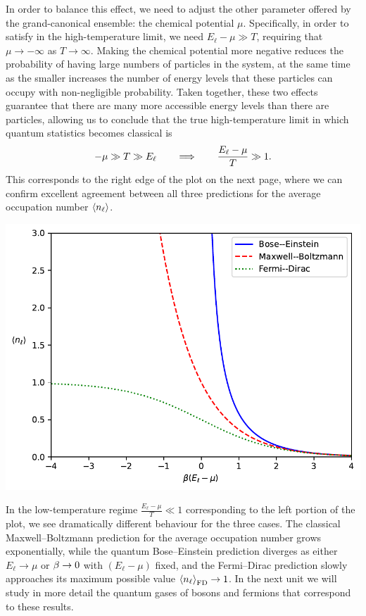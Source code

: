 In order to balance this effect, we need to adjust the other parameter offered by the grand-canonical ensemble: the chemical potential $\mu$.
Specifically, in order to satisfy  in the high-temperature limit, we need $E_{\ell} - \mu \gg T$, requiring that $\mu \to -\infty$ as $T \to \infty$.
Making the chemical potential more negative reduces the probability of having large numbers of particles in the system, at the same time as the smaller \be increases the number of energy levels that these particles can occupy with non-negligible probability.
Taken together, these two effects guarantee that there are many more accessible energy levels than there are particles, allowing us to conclude that the true high-temperature limit in which quantum statistics becomes classical is
\begin{equation}
  -\mu \gg T \gg E_{\ell} \qquad \Longrightarrow \qquad \frac{E_{\ell} - \mu}{T} \gg 1.
\end{equation}
This corresponds to the right edge of the plot on the next page, where we can confirm excellent agreement between all three predictions for the average occupation number $\left\langle n_{\ell} \right\rangle$.

\begin{center}\includegraphics[width=\textwidth]{figs/unit07_dist.pdf}\end{center}

In the low-temperature regime $\frac{E_{\ell} - \mu}{T} \ll 1$ corresponding to the left portion of the plot, we see dramatically different behaviour for the three cases.
The classical Maxwell--Boltzmann prediction for the average occupation number grows exponentially, while the quantum Bose--Einstein prediction diverges as either $E_{\ell} \to \mu$ or $\beta \to 0$ with $(E_{\ell} - \mu)$ fixed, and the Fermi--Dirac prediction slowly approaches its maximum possible value $\left\langle n_{\ell} \right\rangle_{\text{FD}} \to 1$.
In the next unit we will study in more detail the quantum gases of bosons and fermions that correspond to these results.
